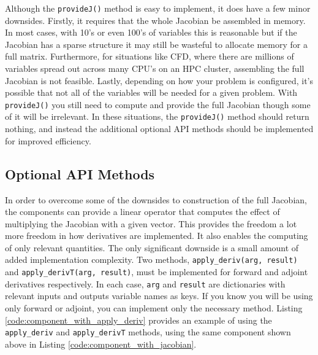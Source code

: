 \documentclass[]{aiaa-tc} %
\begin{document}
        Although the \texttt{provideJ()} method is easy to implement, it does have a few minor downsides. Firstly, 
        it requires that the whole Jacobian be assembled in memory. In most cases, with 10's or even 100's of variables
        this is reasonable but if the Jacobian has a sparse structure it may still be wasteful to allocate memory for a
        full matrix. Furthermore, for situations like CFD, where there are millions of variables spread out 
        across many CPU's on an HPC cluster, assembling the full Jacobian is not feasible. Lastly, depending on how 
        your problem is configured, it's possible that not all of the variables will be needed for a given problem. With 
        \texttt{provideJ()} you still need to compute and provide the full Jacobian though some of it will be irrelevant. 
        In these situations, the \texttt{provideJ()} method should return nothing, and instead the 
        additional optional API methods should be implemented for improved efficiency. 

    \subsection{Optional API Methods}

        In order to overcome some of the downsides to construction of the full Jacobian, the components can provide 
        a linear operator that computes the effect of multiplying the Jacobian with a given vector. This provides 
        the freedom a lot more freedom in how derivatives are implemented. It also enables the computing of only
        relevant quantities. The only significant downside is a small amount of added implementation complexity. 
        Two methods, \texttt{apply\_deriv(arg, result)} and \texttt{apply\_derivT(arg, result)}, must be implemented 
        for forward and adjoint derivatives respectively. In each case, \texttt{arg} and \texttt{result} 
        are dictionaries with relevant inputs and outputs variable names as keys. 
        If you know you will be using only forward or adjoint, you can implement only the 
        necessary method. Listing \ref{code:component_with_apply_deriv} provides an example of 
        using the \texttt{apply\_deriv} and \texttt{apply\_derivT} methods, using the same component shown above in
        Listing \ref{code:component_with_jacobian}.
\end{document}
